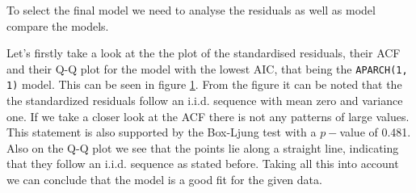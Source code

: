 \documentclass{article}
\begin{document}
To select the final model we need to analyse  the residuals as well as model 
compare the models.

Let's firstly take a look at the the plot of the standardised residuals, their ACF and their Q-Q plot for the model with the lowest AIC, that being the \verb|APARCH(1, 1)| model. This can be seen in figure \ref{fig:aparch_rd}. From the figure it can be noted that the the standardized residuals follow an i.i.d. sequence with mean zero and variance one. If we take a closer look at the ACF there is not any patterns of large values. This statement is also supported by the Box-Ljung test with a $p-$value of 0.481.
Also on the Q-Q plot we see that the points lie along a straight line, indicating that they follow an i.i.d. sequence as stated before. Taking all this into account we can conclude that the model is a good fit for the given data.

\begin{figure}[ht!]
   \centering

    \label{fig:aparch_rd}
\end{figure}
\end{document}
